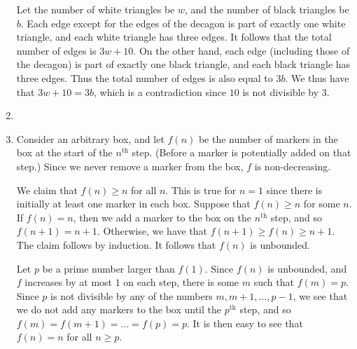 \documentclass[12pt]{article}
\begin{document}
\begin{enumerate}
%
Let the number of white triangles be $w$, and the number of black triangles be
$b$. Each edge except for the edges of the decagon is part of exactly one white
triangle, and each white triangle has three edges. It follows that the total
number of edges is $3w + 10$. On the other hand, each edge (including those of
the decagon) is part of exactly one black triangle, and each black triangle has
three edges. Thus the total number of edges is also equal to $3b$. We thus have
that $3w + 10 = 3b$, which is a contradiction since $10$ is not divisible by
$3$.


\item %


\item %
Consider an arbitrary box, and let $f(n)$ be the number of markers in the box at
the start of the $n^\text{th}$ step. (Before a marker is potentially added on
that step.) Since we never remove a marker from the box, $f$ is non-decreasing.

We claim that $f(n) \geq n$ for all $n$. This is true for $n = 1$ since there is
initially at least one marker in each box. Suppose that $f(n) \geq n$ for some
$n$. If $f(n) = n$, then we add a marker to the box on the $n^\text{th}$ step,
and so $f(n + 1) = n + 1$. Otherwise, we have that $f(n + 1) \geq f(n) \geq n +
1$. The claim follows by induction. It follows that $f(n)$ is unbounded.

Let $p$ be a prime number larger than $f(1)$. Since $f(n)$ is unbounded, and $f$
increases by at most $1$ on each step, there is some $m$ such that $f(m) = p$.
Since $p$ is not divisible by any of the numbers $m, m + 1, \dots, p - 1$, we
see that we do not add any markers to the box until the $p^\text{th}$ step, and
so $f(m) = f(m + 1) = \dots = f(p) = p$. It is then easy to see that $f(n) = n$
for all $n \geq p$.


\end{enumerate}
\end{document}
